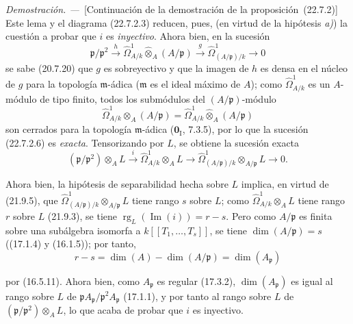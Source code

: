 \documentclass[10pt,oneside]{book}
\newcommand{\oldpage}[2][]{%
  \setcounter{footnote}{0}%
  \marginpar{\scriptsize\textbf{#1}~|~#2}\ignorespaces}
\newenvironment{proof}{%
  \par\medskip\noindent\textit{Demostración. ---\ }}{\par}
\providecommand{\setmin}{-}%
\begin{document}
\begin{proof}[Continuación de la demostración de la proposición~{\rm(22.7.2)}]
Este lema y el diagrama (22.7.2.3) reducen, pues, (en virtud de la hipótesis \emph{a)})
la cuestión a probar que $i$ es \emph{inyectivo}. Ahora bien, en la sucesión
\begin{equation}
\label{0.22.7.2.6-es}
  \mathfrak p/\mathfrak p^2\xrightarrow{h}
  \widehat\Omega^1_{A/k}\widehat\otimes_A(A/\mathfrak p)
  \xrightarrow{g}\widehat\Omega^1_{(A/\mathfrak p)/k}\longrightarrow0
  \tag{22.7.2.6}
\end{equation}
se sabe (20.7.20) que $g$ es sobreyectivo y que la imagen de $h$ es densa en
el núcleo de $g$ para la topología $\mathfrak m$-ádica ($\mathfrak m$ es
el ideal máximo de $A$); como $\widehat\Omega^1_{A/k}$ es un $A$-módulo de
tipo finito, todos los submódulos del $(A/\mathfrak p)$-módulo
\[
  \widehat\Omega^1_{A/k}\otimes_A(A/\mathfrak p)
  =\widehat\Omega^1_{A/k}\widehat\otimes_A(A/\mathfrak p)
\]
son cerrados para la topología $\mathfrak m$-ádica ($\mathbf{0}_{\mathrm I}$, 7.3.5),
por lo que la sucesión (22.7.2.6) es \emph{exacta}. Tensorizando por $L$, se obtiene la sucesión
exacta
\[
  (\mathfrak p/\mathfrak p^2)\otimes_AL\xrightarrow{i}
  \widehat\Omega^1_{A/k}\otimes_AL\longrightarrow
  \widehat\Omega^1_{(A/\mathfrak p)/k}\otimes_{A/\mathfrak p}L
  \longrightarrow0.
\]

Ahora bien, la hipótesis de separabilidad hecha sobre $L$ implica, en virtud de (21.9.5),
que $\widehat\Omega^1_{(A/\mathfrak p)/k}\otimes_{A/\mathfrak p}L$ tiene
rango $s$ sobre $L$; como $\widehat\Omega^1_{A/k}\otimes_AL$ tiene rango $r$
sobre $L$ (21.9.3), se tiene $\operatorname{rg}_L(\operatorname{Im}(i))=r\setmin s$. Pero como
$A/\mathfrak p$ es finita sobre una subálgebra isomorfa a
$k[[T_1,\ldots,T_s]]$, se tiene $\dim(A/\mathfrak p)=s$ ((17.1.4) y (16.1.5));
por tanto,
\[
  r\setmin s=\dim(A)\setmin\dim(A/\mathfrak p)=\dim(A_{\mathfrak p})
\]

\oldpage[0\textsubscript{IV-1}]{211}

por (16.5.11). Ahora bien, como $A_{\mathfrak p}$ es regular (17.3.2),
$\dim(A_{\mathfrak p})$ es igual al rango sobre $L$ de
$\mathfrak pA_{\mathfrak p}/\mathfrak p^2A_{\mathfrak p}$ (17.1.1), y por tanto al
rango sobre $L$ de $(\mathfrak p/\mathfrak p^2)\otimes_AL$, lo que acaba de
probar que $i$ es inyectivo.
\end{proof}
\end{document}
